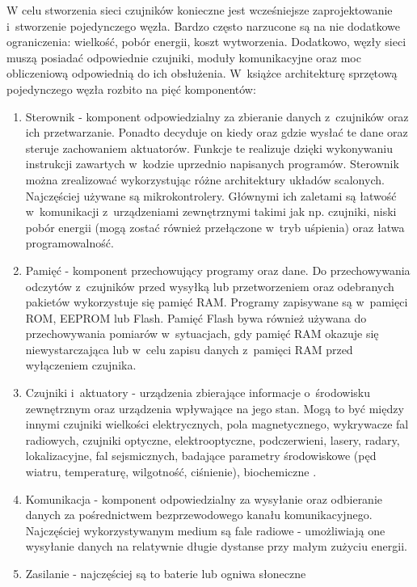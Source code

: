 W celu stworzenia sieci czujników konieczne jest wcześniejsze zaprojektowanie i~stworzenie pojedynczego węzła. Bardzo często narzucone są na nie dodatkowe ograniczenia: wielkość, pobór energii, koszt wytworzenia. Dodatkowo, węzły sieci muszą posiadać odpowiednie czujniki, moduły komunikacyjne oraz moc obliczeniową odpowiednią do ich obsłużenia. W~książce \cite{Karl2006} architekturę sprzętową pojedynczego węzła rozbito na pięć komponentów:
\begin{enumerate}
	\item Sterownik - komponent odpowiedzialny za zbieranie danych z~czujników oraz ich przetwarzanie. Ponadto decyduje on kiedy oraz gdzie wysłać te dane oraz steruje zachowaniem aktuatorów. Funkcje te realizuje dzięki wykonywaniu instrukcji zawartych w~kodzie uprzednio napisanych programów. Sterownik można zrealizować wykorzystując różne architektury układów scalonych. Najczęściej używane są mikrokontrolery. Głównymi ich zaletami są łatwość w~komunikacji z~urządzeniami zewnętrznymi takimi jak np. czujniki, niski pobór energii (mogą zostać również przełączone w~tryb uśpienia) oraz łatwa programowalność.
	\item Pamięć - komponent przechowujący programy oraz dane. Do przechowywania odczytów z~czujników przed wysyłką lub przetworzeniem oraz odebranych pakietów wykorzystuje się pamięć RAM. Programy zapisywane są w~pamięci ROM, EEPROM lub Flash. Pamięć Flash bywa również używana do przechowywania pomiarów w~sytuacjach, gdy pamięć RAM okazuje się niewystarczająca lub w~celu zapisu danych z~pamięci RAM przed wyłączeniem czujnika.   
	\item Czujniki i~aktuatory - urządzenia zbierające informacje o~środowisku zewnętrznym oraz urządzenia wpływające na jego stan. Mogą to być między innymi czujniki wielkości elektrycznych, pola magnetycznego, wykrywacze fal radiowych, czujniki optyczne, elektrooptyczne, podczerwieni, lasery, radary, lokalizacyjne, fal sejsmicznych, badające parametry środowiskowe (pęd wiatru, temperaturę, wilgotność, ciśnienie), biochemiczne \cite{Sohraby2006}.
	\item Komunikacja - komponent odpowiedzialny za wysyłanie oraz odbieranie danych za pośrednictwem bezprzewodowego kanału komunikacyjnego. Najczęściej wykorzystywanym medium są fale radiowe - umożliwiają one wysyłanie danych na relatywnie długie dystanse przy małym zużyciu energii. 
	\item Zasilanie - najczęściej są to baterie lub ogniwa słoneczne
\end{enumerate}

